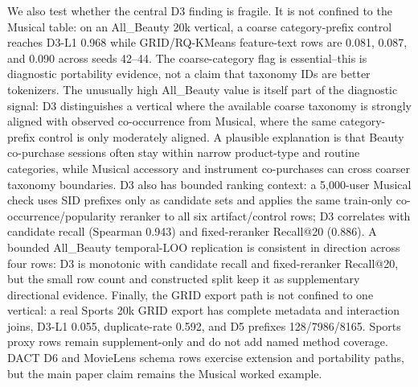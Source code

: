 We also test whether the central D3 finding is fragile. It is not confined to
the Musical table: on an All\_Beauty 20k vertical, a
coarse category-prefix control reaches D3-L1 0.968 while GRID/RQ-KMeans
feature-text rows are 0.081, 0.087, and 0.090 across seeds 42--44. The
coarse-category flag is essential--this is diagnostic portability evidence, not
a claim that taxonomy IDs are better tokenizers. The unusually high
All\_Beauty value is itself part of the diagnostic signal: D3 distinguishes a
vertical where the available coarse taxonomy is strongly aligned with observed
co-occurrence from Musical, where the same category-prefix control is only
moderately aligned. A plausible explanation is that Beauty co-purchase sessions
often stay within narrow product-type and routine categories, while Musical
accessory and instrument co-purchases can cross coarser taxonomy boundaries.
D3 also has bounded ranking
context: a 5,000-user Musical check uses SID prefixes only as candidate sets
and applies the same train-only co-occurrence/popularity reranker to all six
artifact/control rows; D3 correlates with candidate recall (Spearman 0.943) and
fixed-reranker Recall@20 (0.886). A bounded All\_Beauty temporal-LOO
replication is consistent in direction across four rows: D3 is monotonic with
candidate recall and fixed-reranker Recall@20, but the small row count and
constructed split keep it as supplementary directional evidence. Finally, the
GRID export path is not confined to one vertical: a real Sports 20k GRID export
has complete metadata and interaction joins, D3-L1 0.055, duplicate-\sid rate
0.592, and D5 prefixes 128/7986/8165. Sports proxy rows remain supplement-only
and do not add named method coverage. DACT D6 and MovieLens schema rows
exercise extension and portability paths, but the main paper claim remains the
Musical worked example.
